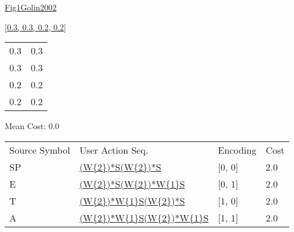 \documentclass[12pt]{article}
\begin{document}
\noindent \url{Fig1Golin2002}

\noindent \url{[0.3, 0.3, 0.2, 0.2]}

\noindent\begin{tt}
\begin{small}
\begin{bundle}{}
\end{bundle}
\end{small}
\end{tt}
\newpage%
\begin{tabular}{l l}0.3	&	0.3\\
0.3	&	0.3\\
0.2	&	0.2\\
0.2	&	0.2\\
\end{tabular}\newpage
\noindent
\noindent Mean Cost: 0.0\\
\begin{tabular}{l l l l}
Source Symbol	&	User Action Seq.	&	Encoding	&	Cost\\
SP	&	\url{(W{2})*S(W{2})*S}	&	[0, 0]	&	2.0\\
E	&	\url{(W{2})*S(W{2})*W{1}S}	&	[0, 1]	&	2.0\\
T	&	\url{(W{2})*W{1}S(W{2})*S}	&	[1, 0]	&	2.0\\
A	&	\url{(W{2})*W{1}S(W{2})*W{1}S}	&	[1, 1]	&	2.0\\
\end{tabular}
\end{document}
